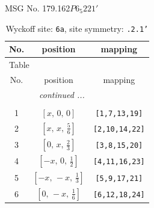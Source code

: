 \documentclass[fleqn,8pt]{jsarticle}
\begin{document}
\setcounter{MaxMatrixCols}{32}

\renewcommand{\tablename}{Table~}
\renewcommand{\figurename}{Figure~}
\begin{center}
\LARGE
MSG No. 179.162\quad$P6_{5}221'$
\end{center}
\renewcommand{\arraystretch}{1.2}
\begin{longtable}{ccc}
\caption{Wyckoff site: {\tt 6a}, site symmetry: {\tt .2.1'}}
 \\
 \hline \hline
No. & position & mapping \\ \hline \endfirsthead

\multicolumn{2}{l}{\tablename\ \thetable{}} \\
 \hline \hline
No. & position & mapping \\ \hline \endhead

 \hline \hline
\multicolumn{2}{r}{\footnotesize\it continued ...} \\ \endfoot

 \hline \hline
\multicolumn{2}{r}{} \\ \endlastfoot

1 & $\left[ x,\, 0,\, 0 \right]$ & {\tt [1,7,13,19]} \\ \hline
2 & $\left[ x,\, x,\, \frac{5}{6} \right]$ & {\tt [2,10,14,22]} \\ \hline
3 & $\left[ 0,\, x,\, \frac{2}{3} \right]$ & {\tt [3,8,15,20]} \\ \hline
4 & $\left[ - x,\, 0,\, \frac{1}{2} \right]$ & {\tt [4,11,16,23]} \\ \hline
5 & $\left[ - x,\, - x,\, \frac{1}{3} \right]$ & {\tt [5,9,17,21]} \\ \hline
6 & $\left[ 0,\, - x,\, \frac{1}{6} \right]$ & {\tt [6,12,18,24]} \\
\end{longtable}
\renewcommand{\arraystretch}{1.2}
\end{document}
